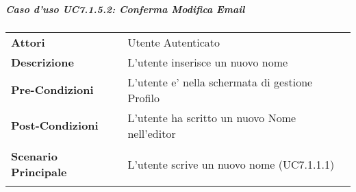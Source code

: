 \subparagraph{Caso d'uso UC7.1.5.2:  Conferma Modifica Email}
\label{UC7_1_5_2}

\begin{tabular}{ l | p{11cm}}
	\hline
	\rowcolor{Gray}
	 \multicolumn{2}{c}{UC7.1.5.2:  Conferma Modifica Email} \\
	 \hline
	\textbf{Attori} & Utente Autenticato \\
	\textbf{Descrizione} & L'utente inserisce un nuovo nome\\
	\textbf{Pre-Condizioni} & L'utente e' nella schermata di gestione Profilo\\
	\textbf{Post-Condizioni} & L'utente ha scritto un nuovo Nome nell'editor\\
	\textbf{Scenario Principale} & 
	\begin{enumerate*}[label=(\arabic*.),itemjoin={\newline}]
		\item L'utente scrive un nuovo nome (UC7.1.1.1)
	\end{enumerate*}\\
\end{tabular}